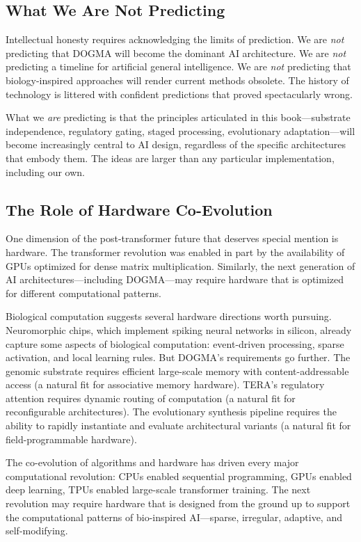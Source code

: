 \subsection{What We Are Not Predicting}

Intellectual honesty requires acknowledging the limits of prediction. We are \emph{not} predicting that DOGMA will become the dominant AI architecture. We are \emph{not} predicting a timeline for artificial general intelligence. We are \emph{not} predicting that biology-inspired approaches will render current methods obsolete. The history of technology is littered with confident predictions that proved spectacularly wrong.

What we \emph{are} predicting is that the principles articulated in this book---substrate independence, regulatory gating, staged processing, evolutionary adaptation---will become increasingly central to AI design, regardless of the specific architectures that embody them. The ideas are larger than any particular implementation, including our own.

\subsection{The Role of Hardware Co-Evolution}

One dimension of the post-transformer future that deserves special mention is hardware. The transformer revolution was enabled in part by the availability of GPUs optimized for dense matrix multiplication. Similarly, the next generation of AI architectures---including DOGMA---may require hardware that is optimized for different computational patterns.

Biological computation suggests several hardware directions worth pursuing. Neuromorphic chips, which implement spiking neural networks in silicon, already capture some aspects of biological computation: event-driven processing, sparse activation, and local learning rules. But DOGMA's requirements go further. The genomic substrate requires efficient large-scale memory with content-addressable access (a natural fit for associative memory hardware). TERA's regulatory attention requires dynamic routing of computation (a natural fit for reconfigurable architectures). The evolutionary synthesis pipeline requires the ability to rapidly instantiate and evaluate architectural variants (a natural fit for field-programmable hardware).

The co-evolution of algorithms and hardware has driven every major computational revolution: CPUs enabled sequential programming, GPUs enabled deep learning, TPUs enabled large-scale transformer training. The next revolution may require hardware that is designed from the ground up to support the computational patterns of bio-inspired AI---sparse, irregular, adaptive, and self-modifying.

